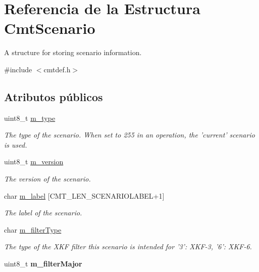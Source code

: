 \hypertarget{structCmtScenario}{\section{\-Referencia de la \-Estructura \-Cmt\-Scenario}
\label{structCmtScenario}
}


\-A structure for storing scenario information.  




{\ttfamily \#include $<$cmtdef.\-h$>$}

\subsection*{\-Atributos públicos}
\begin{DoxyCompactItemize}
\item 
\hypertarget{structCmtScenario_a161e8f147c0e05b2f89dd09359c64594}{uint8\-\_\-t \hyperlink{structCmtScenario_a161e8f147c0e05b2f89dd09359c64594}{m\-\_\-type}}\label{structCmtScenario_a161e8f147c0e05b2f89dd09359c64594}

\begin{DoxyCompactList}\small\item\em \-The type of the scenario. \-When set to 255 in an operation, the 'current' scenario is used. \end{DoxyCompactList}\item 
\hypertarget{structCmtScenario_aa88dfbeb0f0c1ecfce74e4c0f7cb3904}{uint8\-\_\-t \hyperlink{structCmtScenario_aa88dfbeb0f0c1ecfce74e4c0f7cb3904}{m\-\_\-version}}\label{structCmtScenario_aa88dfbeb0f0c1ecfce74e4c0f7cb3904}

\begin{DoxyCompactList}\small\item\em \-The version of the scenario. \end{DoxyCompactList}\item 
\hypertarget{structCmtScenario_aaeb9317685371f673cc4812483ae80bf}{char \hyperlink{structCmtScenario_aaeb9317685371f673cc4812483ae80bf}{m\-\_\-label} \mbox{[}\-C\-M\-T\-\_\-\-L\-E\-N\-\_\-\-S\-C\-E\-N\-A\-R\-I\-O\-L\-A\-B\-E\-L+1\mbox{]}}\label{structCmtScenario_aaeb9317685371f673cc4812483ae80bf}

\begin{DoxyCompactList}\small\item\em \-The label of the scenario. \end{DoxyCompactList}\item 
char \hyperlink{structCmtScenario_a4b487cecc6f4d44e304c57b5e441f01a}{m\-\_\-filter\-Type}
\begin{DoxyCompactList}\small\item\em \-The type of the \-X\-K\-F filter this scenario is intended for '3'\-: \-X\-K\-F-\/3, '6'\-: \-X\-K\-F-\/6. \end{DoxyCompactList}\item 
\hypertarget{structCmtScenario_af27052279f30d26a6558624dedb0bf4d}{uint8\-\_\-t {\bfseries m\-\_\-filter\-Major}}\label{structCmtScenario_af27052279f30d26a6558624dedb0bf4d}


\end{DoxyCompactItemize}
